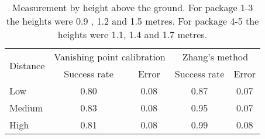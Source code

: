 \begin{table}[H]
\centering
\begin{tabular}{@{} l *4c @{}}
\toprule
\multirow{2}{*}{Distance} & \multicolumn{2}{c}{Vanishing point calibration} & \multicolumn{2}{c}{Zhang's method}\\ 
\cmidrule(r){2-3}
\cmidrule(r){4-5}
& Success rate & Error & Success rate & Error \\
\midrule
 Low 		& 0.80 & 0.08 & 0.87 & 0.07 \\
 Medium 	& 0.83 & 0.08 & 0.95 & 0.07 \\
 High		& 0.81 & 0.08 & 0.99 & 0.08 \\

\bottomrule
 \end{tabular}
 \caption{Measurement by height above the ground. For package 1-3 the heights were 0.9 , 1.2 and 1.5 metres. For package 4-5 the heights were 1.1, 1.4 and 1.7 metres.} 
\label{table:key_measurement_by_height}
\end{table}